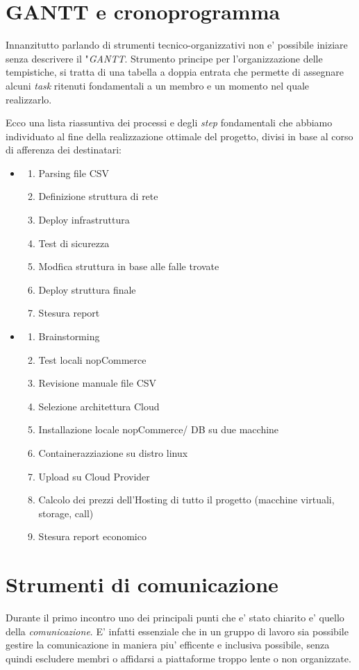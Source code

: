 \documentclass[a4paper]{report}
\begin{document}
	\section{GANTT e cronoprogramma} \label{gantt_e_cronoprogramma}
		Innanzitutto parlando di strumenti tecnico-organizzativi non e' possibile iniziare senza descrivere il
		"\emph{GANTT}.  Strumento principe per l'organizzazione delle tempistiche, si tratta di una tabella a doppia
		entrata che permette di assegnare alcuni \emph{task} ritenuti fondamentali a un membro e un momento nel quale
		realizzarlo.

		Ecco una lista riassuntiva dei processi e degli \emph{step} fondamentali che abbiamo individuato al fine della
		realizzazione ottimale del progetto, divisi in base al corso di afferenza dei destinatari:
		\begin{itemize}
			\item \begin{enumerate}
					\item Parsing file CSV
					\item Definizione struttura di rete
					\item Deploy infrastruttura
					\item Test di sicurezza
					\item Modfica struttura in base alle falle trovate
					\item Deploy struttura finale
					\item Stesura report
				\end{enumerate}
			\item \begin{enumerate}
					\item Brainstorming
					\item Test locali nopCommerce
					\item Revisione manuale file CSV
					\item Selezione architettura Cloud
					\item Installazione locale nopCommerce/ DB su due macchine
					\item Containerazziazione su distro linux
					\item Upload su Cloud Provider 
					\item Calcolo dei prezzi dell'Hosting di tutto il progetto (macchine virtuali, storage, call)
					\item Stesura report economico
				\end{enumerate}
		\end{itemize}
	\section{Strumenti di comunicazione} \label{strumenti di comunicazione}
		Durante il primo incontro uno dei principali punti che e' stato chiarito e' quello della \emph{comunicazione}.
		E' infatti essenziale che in un gruppo di lavoro sia possibile gestire la comunicazione in maniera piu'
		efficente e inclusiva possibile, senza quindi escludere membri o affidarsi a piattaforme troppo lente o non
		organizzate.
		
\end{document}

